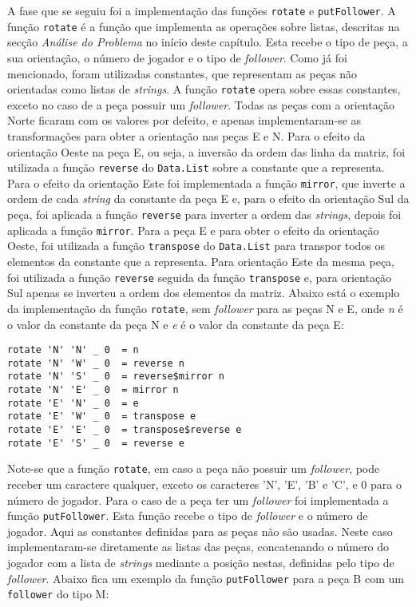 A fase que  se seguiu foi a  implementação das funções \texttt{rotate} e  \texttt{putFollower}. A função
\texttt{rotate} é a função que implementa as operações sobre listas, descritas na secção \emph{Análise
do Problema} no início deste capítulo. Esta recebe o tipo de peça, a sua orientação, o número de jogador e o
tipo de \emph{follower}. Como já foi mencionado, foram utilizadas constantes, que representam
as peças não orientadas como listas de \emph{strings}. A função \texttt{rotate} opera sobre essas constantes,
exceto no caso de a peça possuir um \emph{follower}. Todas as peças com a orientação Norte ficaram com os
valores por defeito, e apenas implementaram-se as transformações para obter a orientação nas peças E e N.
Para o efeito da orientação Oeste na peça E, ou seja, a inversão da ordem das linha da matriz,
 foi utilizada a função \texttt{reverse} do \texttt{Data.List} sobre a constante que a representa. Para o
efeito da orientação Este foi implementada a função \texttt{mirror}, que inverte a ordem de cada
\emph{string} da constante da peça E e, para o efeito da orientação Sul da peça, foi aplicada a função
\texttt{reverse} para inverter a ordem das \emph{strings}, depois foi aplicada a função \texttt{mirror}.
Para a peça E e para obter o efeito da orientação Oeste, foi utilizada a função \texttt{transpose} do
\texttt{Data.List} para transpor todos os elementos da constante que a representa. Para orientação Este da
mesma peça, foi utilizada a função \texttt{reverse} seguida da função \texttt{transpose} e, para orientação
Sul apenas se inverteu a ordem dos elementos da matriz. Abaixo está o exemplo da implementação da função
\texttt{rotate}, sem \emph{follower} para as peças N e E, onde \emph{n} é o valor da constante da peça N e
\emph{e} é o valor da constante da peça E:
\begin{verbatim}
rotate 'N' 'N' _ 0  = n
rotate 'N' 'W' _ 0  = reverse n
rotate 'N' 'S' _ 0  = reverse$mirror n
rotate 'N' 'E' _ 0  = mirror n
rotate 'E' 'N' _ 0  = e
rotate 'E' 'W' _ 0  = transpose e
rotate 'E' 'E' _ 0  = transpose$reverse e
rotate 'E' 'S' _ 0  = reverse e
\end{verbatim}
Note-se que a função \texttt{rotate}, em caso a peça não possuir um \emph{follower}, pode receber um caractere
qualquer, exceto os caracteres 'N', 'E', 'B' e 'C',  e 0 para o número de jogador. Para o caso de a peça ter
um \emph{follower} foi implementada a função \texttt{putFollower}. Esta função recebe o tipo de
\emph{follower} e o número de jogador. Aqui as constantes definidas para as peças não são usadas. Neste caso
implementaram-se diretamente as listas das peças, concatenando o número do jogador com a lista de
\emph{strings} mediante a posição nestas, definidas pelo tipo de \emph{follower}. Abaixo fica um exemplo da função
\texttt{putFollower} para a peça B com um \texttt{follower} do tipo M:

